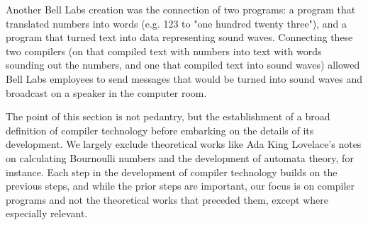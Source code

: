 Another Bell Labs creation was the connection of two
programs: a program that translated numbers into words (e.g. 123 to "one
hundred twenty three"), and a program that turned text into data representing
sound waves. Connecting these two compilers (on that compiled text with numbers
into text with words sounding out the numbers, and one that compiled text into
sound waves) allowed Bell Labs employees to send messages that would be turned
into sound waves and broadcast on a speaker in the computer room.

The point of
this section is not pedantry, but the establishment of a broad definition of compiler
technology before embarking on the details of its development.
We largely exclude theoretical
works like Ada King Lovelace's notes on calculating Bournoulli numbers and the
development of automata theory, for instance. Each step in the development of
compiler technology builds on the previous steps, and while the prior steps are
important, our focus is on compiler programs and not the theoretical works that
preceded them, except where especially relevant.
